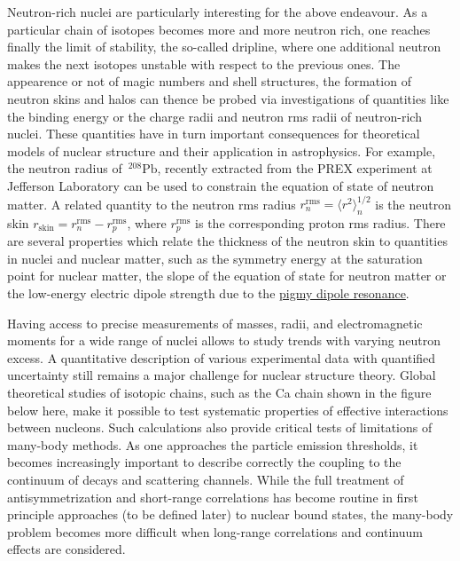 \documentclass[%
oneside,                 %
final,                   %
10pt]{article}
\begin{document}
Neutron-rich nuclei are particularly interesting for the above endeavour. As a particular chain
of isotopes becomes more and more neutron rich, one reaches finally the limit of stability, the so-called
dripline, where one additional neutron makes the next isotopes unstable with respect 
to the previous ones. The appearence or not of magic numbers and shell structures,
the formation of neutron skins and halos
can thence be probed via investigations of quantities like  the binding energy
or the charge radii and neutron rms radii of neutron-rich nuclei. 
These quantities have in turn important 
consequences for theoretical models of nuclear structure and their application in astrophysics.
For example, the neutron radius of $\,{}^{208}\mbox{Pb}$, recently extracted from the PREX 
experiment at Jefferson Laboratory  can be used to constrain the equation of state of 
neutron matter. A related quantity to the
neutron rms radius $r_n^{\mathrm{rms}}=\langle r^2\rangle_n^{1/2}$ is the neutron skin 
$r_{\mathrm{skin}}=r_n^{\mathrm{rms}}-r_p^{\mathrm{rms}}$,
where $r_p^{\mathrm{rms}}$ is the corresponding proton rms radius.  
There are several properties which relate the thickness of the neutron skin to quantities in nuclei and 
nuclear matter, such as the symmetry energy at the saturation point for nuclear matter, the slope
of the equation of state for neutron matter
or the low-energy electric dipole strength due to the \href{{http://iopscience.iop.org/1402-4896/2013/T152}}{pigmy dipole resonance}.


Having access to precise measurements of masses, radii, and
electromagnetic moments for a wide range of nuclei allows to study
trends with varying neutron excess. A quantitative description of
various experimental data with quantified uncertainty still remains a
major challenge for nuclear structure theory.  Global theoretical
studies of isotopic chains, such as the Ca chain shown in the figure below here, make it possible to test systematic
properties of effective interactions between nucleons. Such calculations also
provide critical tests of limitations of many-body methods. As one
approaches the particle emission thresholds, it becomes increasingly
important to describe correctly the coupling to the continuum of
decays and scattering channels. While the
full treatment of antisymmetrization and short-range correlations has
become routine in first principle  approaches (to be defined later) to nuclear bound states, the
many-body problem becomes more difficult when long-range correlations
and continuum effects are considered.
\end{document}

